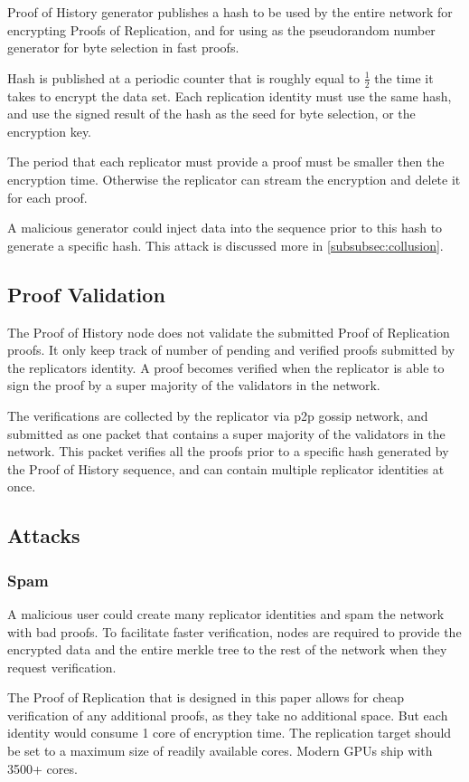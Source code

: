 \documentclass[12pt]{article}
\begin{document}
Proof of History generator publishes a hash to be used by the entire network for encrypting Proofs of Replication, and for using as the pseudorandom number generator for byte selection in fast proofs.

Hash is published at a periodic counter that is roughly equal to \(\frac{1}{2}\) the time it takes to encrypt the data set. Each replication identity must use the same hash, and use the signed result of the hash as the seed for byte selection, or the encryption key.

The period that each replicator must provide a proof must be smaller then the encryption time.  Otherwise the replicator can stream the encryption and delete it for each proof.

A malicious generator could inject data into the sequence prior to this hash to generate a specific hash. This attack is discussed more in \ref{subsubsec:collusion}.

\subsection{Proof Validation}
The Proof of History node does not validate the submitted Proof of Replication proofs. It only keep track of number of pending and verified proofs submitted by the replicators identity. A proof becomes verified when the replicator is able to sign the proof by a super majority of the validators in the network. 

The verifications are collected by the replicator via p2p gossip network, and submitted as one packet that contains a super majority of the validators in the network. This packet verifies all the proofs prior to a specific hash generated by the Proof of History sequence, and can contain multiple replicator identities at once.
\subsection{Attacks}
\subsubsection{Spam}
A malicious user could create many replicator identities and spam the network with bad proofs. To facilitate faster verification, nodes are required to provide the encrypted data and the entire merkle tree to the rest of the network when they request verification.

The Proof of Replication that is designed in this paper allows for cheap verification of any additional proofs, as they take no additional space. But each identity would consume 1 core of encryption time. The replication target should be set to a maximum size of readily available cores. Modern GPUs ship with 3500+ cores.
\end{document}
